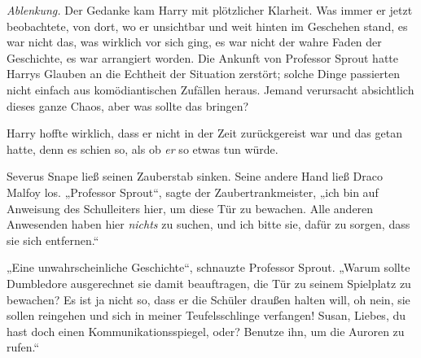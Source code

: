 \emph{Ablenkung.}
Der Gedanke kam Harry mit plötzlicher Klarheit. Was immer er jetzt beobachtete, von dort, wo er unsichtbar und weit hinten im Geschehen stand, es war nicht das, was wirklich vor sich ging, es war nicht der wahre Faden der Geschichte, es war arrangiert worden. Die Ankunft von Professor Sprout hatte Harrys Glauben an die Echtheit der Situation zerstört; solche Dinge passierten nicht einfach aus komödiantischen Zufällen heraus. Jemand verursacht absichtlich dieses ganze Chaos, aber was sollte das bringen?

Harry hoffte wirklich, dass er nicht in der Zeit zurückgereist war und das getan hatte, denn es schien so, als ob \emph{er} so etwas tun würde.

Severus Snape ließ seinen Zauberstab sinken. Seine andere Hand ließ Draco Malfoy los.
„Professor Sprout“, sagte der Zaubertrankmeister, „ich bin auf Anweisung des Schulleiters hier, um diese Tür zu bewachen. Alle anderen Anwesenden haben hier \emph{nichts} zu suchen, und ich bitte sie, dafür zu sorgen, dass sie sich entfernen.“

„Eine unwahrscheinliche Geschichte“, schnauzte Professor Sprout.
„Warum sollte Dumbledore ausgerechnet sie damit beauftragen, die Tür zu seinem Spielplatz zu bewachen? Es ist ja nicht so, dass er die Schüler draußen halten will, oh nein, sie sollen reingehen und sich in meiner Teufelsschlinge verfangen! Susan, Liebes, du hast doch einen Kommunikationsspiegel, oder? Benutze ihn, um die Auroren zu rufen.“

